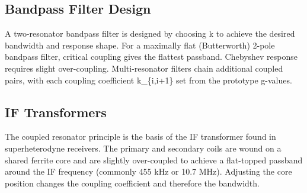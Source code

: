 				

				

\subsection{Bandpass Filter Design}

				

A two-resonator bandpass filter is designed by choosing k to achieve the desired bandwidth and response shape. For a maximally flat (Butterworth) 2-pole bandpass filter, critical coupling gives the flattest passband. Chebyshev response requires slight over-coupling. Multi-resonator filters chain additional coupled pairs, with each coupling coefficient k\_\{i,i+1\} set from the prototype g-values.

				

\subsection{IF Transformers}

				

The coupled resonator principle is the basis of the IF transformer found in superheterodyne receivers. The primary and secondary coils are wound on a shared ferrite core and are slightly over-coupled to achieve a flat-topped passband around the IF frequency (commonly 455 kHz or 10.7 MHz). Adjusting the core position changes the coupling coefficient and therefore the bandwidth.




